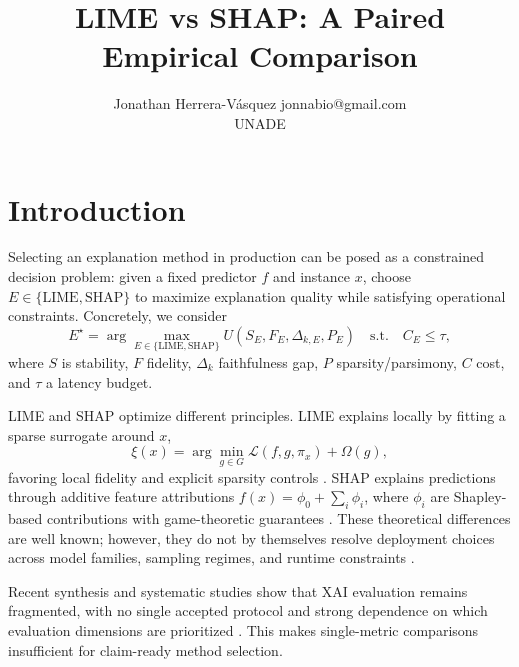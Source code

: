 \documentclass[twoside,11pt]{article}
\begin{document}
\title{LIME vs SHAP: A Paired Empirical Comparison}

\author{
\name Jonathan Herrera-V\'asquez \email jonnabio@gmail.com \\
\addr UNADE
}

\editor{}

\maketitle

\begin{abstract}

\end{abstract}

\begin{keywords}

\end{keywords}

\section{Introduction}

Selecting an explanation method in production can be posed as a
constrained decision problem: given a fixed predictor \(f\) and instance
\(x\), choose \(E \in \{\mathrm{LIME}, \mathrm{SHAP}\}\) to maximize
explanation quality while satisfying operational constraints.
Concretely, we consider
\[
E^\star=\arg\max_{E \in \{\mathrm{LIME},\mathrm{SHAP}\}}
U(S_E,F_E,\Delta_{k,E},P_E)\quad\text{s.t.}\quad C_E \le \tau,
\]
where \(S\) is stability, \(F\) fidelity, \(\Delta_k\) faithfulness
gap, \(P\) sparsity/parsimony, \(C\) cost, and \(\tau\) a latency
budget.

LIME and SHAP optimize different principles. LIME explains locally by
fitting a sparse surrogate around \(x\),
\[
\xi(x)=\arg\min_{g\in G}\mathcal{L}(f,g,\pi_x)+\Omega(g),
\]
favoring local fidelity and explicit sparsity controls
\citep{ribeiro2016why}. SHAP explains predictions through additive
feature attributions \(f(x)=\phi_0+\sum_i \phi_i\), where \(\phi_i\)
are Shapley-based contributions with game-theoretic guarantees
\citep{lundberg2017unified}. These theoretical differences are well
known; however, they do not by themselves resolve deployment choices
across model families, sampling regimes, and runtime constraints
\citep{retzlaff2024posthoc,ali2023trustworthy}.

Recent synthesis and systematic studies show that XAI evaluation
remains fragmented, with no single accepted protocol and strong
dependence on which evaluation dimensions are prioritized
\citep{longo2024manifesto,ali2023trustworthy,pawlicki2024metrics,canha2025benchmark}.
This makes single-metric comparisons insufficient for claim-ready
method selection.
\end{document}
